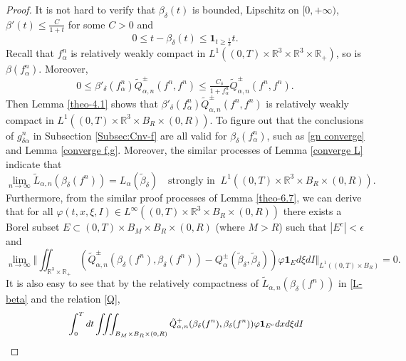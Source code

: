 \documentclass[reqno,11pt]{amsart}
\numberwithin{equation}{section}
\def\R{\mathbb{R}}
\begin{document}
\begin{proof}
	It is not hard to verify that $\beta_\delta (t)$ is bounded, Lipschitz on $[0,+\infty)$, $\beta'(t)\leq \frac{C}{1+t}$ for some $C>0$ and 
	\begin{equation}\label{eq h}
		0\leq t -\beta_\delta (t) \leq \mathbf{1}_{t\geq \frac{1}{\delta}} t .
	\end{equation}
Recall that $ f^n_\alpha $ is relatively weakly compact in $L^1((0,T)\times \R^3 \times \R^3 \times \R_+)$, so is $\beta (f^n_\alpha)$. Moreover,
	\begin{equation*}
		0 \leq \beta'_\delta (f^n_\alpha ) \tilde{Q}_{\alpha ,n}^\pm (f^n,f^n) \leq \tfrac{C_\delta}{1+f^n_\alpha} \tilde{Q}_{\alpha ,n}^\pm (f^n,f^n).
	\end{equation*}
Then Lemma \ref{theo-4.1} shows that $\beta'_\delta (f^n_\alpha )\tilde{Q}^\pm _{\alpha ,n}(f^n,f^n)$ is relatively weakly compact in $L^1((0,T)\times \R^3 \times B_R\times (0,R))$. To figure out that the conclusions of $g^n_{\delta \alpha }$ in Subsection \ref{Subsec:Cnv-f} are all valid for $\beta_\delta (f^n_\alpha)$, such as \eqref{gn converge} and Lemma \ref{converge f,g}. Moreover, the similar processes of Lemma \ref{converge L} indicate that 
	\begin{equation}\label{L-beta}
		\lim\limits_{n\rightarrow \infty } \tilde{L}_{\alpha ,n} (\beta_\delta (f^n)) =L_{\alpha } (\tilde{\beta}_\delta)  \quad \text{strongly in } \ L^1((0,T)\times \R^3 \times B_R\times (0,R)).
	\end{equation}
Furthermore, from the similar proof processes of Lemma \ref{theo-6.7}, we can derive that for all $\varphi (t,x, \xi, I) \in L^\infty ((0,T)\times \R^3 \times B_R\times (0,R))$ there exists a Borel subset $E \subset(0,T)\times B_M \times B_R\times (0,R)$ (where $M>R$) such that $|E^c|<\epsilon$ and
	\begin{equation}\label{Qbeta}
		\lim\limits_{n\rightarrow \infty }\Vert \iint_{ \R^3 \times \R_+} (\tilde{Q}^\pm_{\alpha ,n} (\beta_\delta(f^n),\beta_\delta (f^n))-Q^\pm _\alpha (\tilde{\beta }_\delta,\tilde{\beta }_\delta) )\varphi \mathbf{1}_E d\xi dI  \Vert_{L^1((0,T)\times B_R)} = 0.
	\end{equation}
It is also easy to see that by the relatively compactness of $\tilde{L}_{\alpha ,n} (\beta_\delta (f^n))$ in \eqref{L-beta} and the relation \eqref{Q},
	\begin{equation}\label{Qbeta+}{\small
		\begin{aligned}
			&\int_{0}^{T} dt \iiint_{B_M \times B_R \times(0,R)} \tilde{Q}^+_{\alpha ,n} (\beta_\delta(f^n),\beta_\delta (f^n)) \varphi \mathbf{1}_{E^c} dxd\xi dI \\

\end{aligned}}
\end{equation}
\end{proof}
\end{document}
